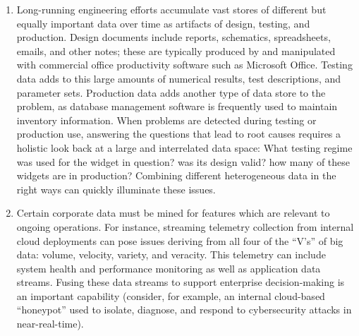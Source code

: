 \begin{enumerate}
\item Long-running engineering efforts accumulate vast stores of different but equally important data
  over time as artifacts of design, testing, and production.  Design documents include reports,
  schematics, spreadsheets, emails, and other notes; these are typically produced by and manipulated with
  commercial office productivity software such as Microsoft Office.  Testing data adds to this large
  amounts of numerical results, test descriptions, and parameter sets.  Production data adds another type
  of data store to the problem, as database management software is frequently used to maintain inventory
  information.  When problems are detected during testing or production use, answering the questions that
  lead to root causes requires a holistic look back at a large and interrelated data space: What testing
  regime was used for the widget in question?  was its design valid?  how many of these widgets are in
  production?  Combining different heterogeneous data in the right ways can quickly illuminate these
  issues.

\item Certain corporate data must be mined for features which are relevant to ongoing operations.  For
  instance, streaming telemetry collection from internal cloud deployments can pose issues deriving from
  all four of the ``V's'' of big data: volume, velocity, variety, and veracity.  This telemetry can
  include system health and performance monitoring as well as application data streams.  Fusing these
  data streams to support enterprise decision-making is an important capability (consider, for example,
  an internal cloud-based ``honeypot'' used to isolate, diagnose, and respond to cybersecurity attacks in
  near-real-time).
\end{enumerate}




